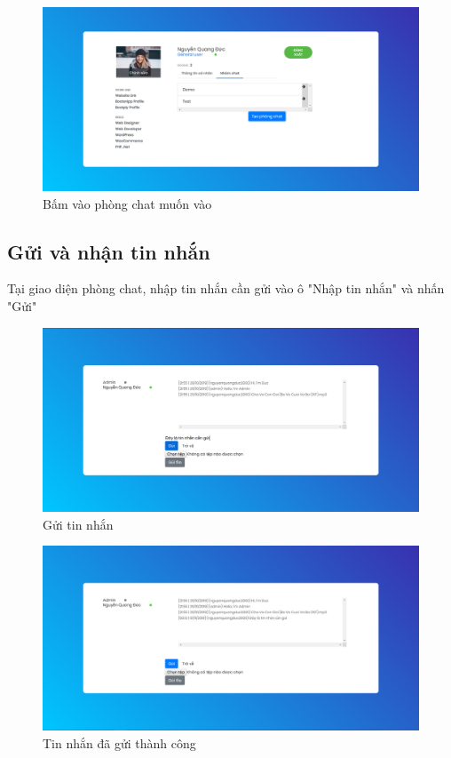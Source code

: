\documentclass[a4paper]{article}
\begin{document}
	\begin{figure}[H]
		\centering
		\includegraphics[scale=0.36]{view_room.png}
		\caption{Bấm vào phòng chat muốn vào}
		\label{F:view_room}
	\end{figure}
	
	\subsection{Gửi và nhận tin nhắn}
	Tại giao diện phòng chat, nhập tin nhắn cần gửi vào ô "Nhập tin nhắn" và nhấn "Gửi"
	
	\begin{figure}[H]
		\centering
		\includegraphics[scale=0.36]{send_message.png}
		\caption{Gửi tin nhắn}
		\label{F:send_message}
	\end{figure}
	
	\begin{figure}[H]
		\centering
		\includegraphics[scale=0.36]{send_message_success.png}
		\caption{Tin nhắn đã gửi thành công}
		\label{F:send_message_success}
	\end{figure}
	
\end{document}
